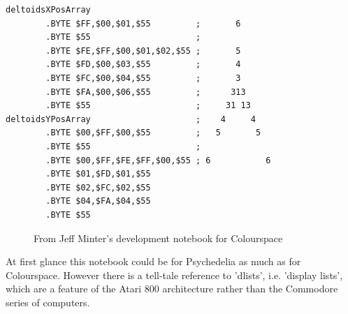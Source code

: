 \begin{lstlisting}
deltoidsXPosArray                     
        .BYTE $FF,$00,$01,$55         ;       6      
        .BYTE $55                     ;              
        .BYTE $FE,$FF,$00,$01,$02,$55 ;       5      
        .BYTE $FD,$00,$03,$55         ;       4      
        .BYTE $FC,$00,$04,$55         ;       3      
        .BYTE $FA,$00,$06,$55         ;      313     
        .BYTE $55                     ;     31 13    
deltoidsYPosArray                     ;    4     4   
        .BYTE $00,$FF,$00,$55         ;   5       5  
        .BYTE $55                     ;              
        .BYTE $00,$FF,$FE,$FF,$00,$55 ; 6           6
        .BYTE $01,$FD,$01,$55
        .BYTE $02,$FC,$02,$55
        .BYTE $04,$FA,$04,$55
        .BYTE $55
\end{lstlisting}

\clearpage
\begin{figure}[H]
    \centering
    \begin{adjustbox}{width=13cm,center}
    \end{adjustbox}
\caption{From Jeff Minter's development notebook for Colourspace}
\end{figure}
\clearpage
At first glance this notebook could be for Psychedelia as much as for Colourspace. However there is a tell-tale reference
to 'dlists', i.e. 'display lists', which are a feature of the Atari 800 architecture rather than the Commodore series of 
computers.

